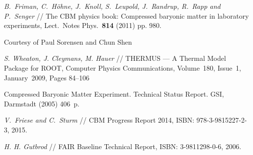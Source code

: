 \begin{thebibliography}{99}


\textit{B.~Friman, C.~H\"{o}hne, J.~Knoll, S.~Leupold, J.~Randrup, R.~Rapp and P.~Senger} //
The CBM physics book: Compressed baryonic matter in laboratory experiments,
Lect.\ Notes Phys.\ {\bf 814} (2011) pp. 980.

Courtesy of Paul Sorensen and Chun Shen \\

\textit{S. Wheaton, J. Cleymans, M. Hauer} //
THERMUS --- A Thermal Model Package for ROOT,
Computer Physics Communications, Volume~180, Issue~1, January~2009, Pages 84--106


Compressed Baryonic Matter Experiment. Technical Status Report.
GSI, Darmstadt (2005) 406~p.

\textit{V.~Friese and C.~Sturm} // %
CBM Progress Report 2014,
ISBN: 978-3-9815227-2-3, 2015.


\textit{H. H. Gutbrod} // %
FAIR Baseline Technical Report,
ISBN: 3-9811298-0-6, 2006.






\end{thebibliography}
